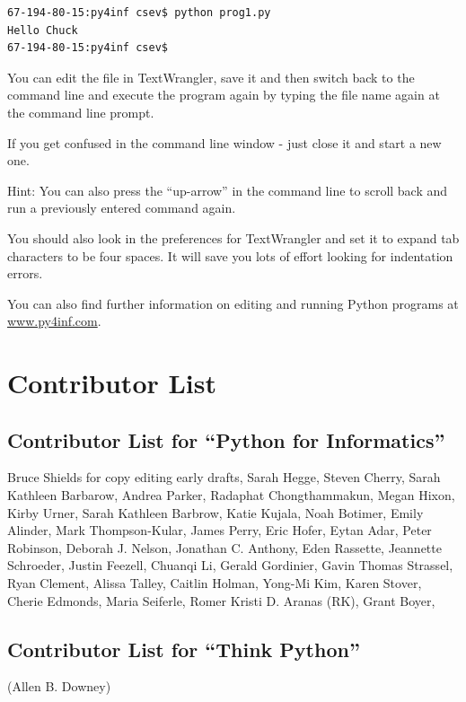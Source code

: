 \documentclass[11pt]{book}
\begin{document}
\beforeverb
\begin{verbatim}
67-194-80-15:py4inf csev$ python prog1.py
Hello Chuck
67-194-80-15:py4inf csev$ 
\end{verbatim}
\afterverb
%
You can edit the file in TextWrangler, save it and then switch back
to the command line and execute the program again by typing
the file name again at the command line prompt.

If you get confused in the command line window - just close it
and start a new one.

Hint: You can also press the ``up-arrow'' in the command line to 
scroll back and run a previously entered command again.

You should also look in the preferences for TextWrangler and set it 
to expand tab characters to be four spaces.  It will save you lots
of effort looking for indentation errors.

You can also find further information on editing and running 
Python programs at \url{www.py4inf.com}.



\chapter{Contributor List}
\section*{Contributor List for ``Python for Informatics''}

Bruce Shields for copy editing early drafts,
Sarah Hegge,
Steven Cherry,
Sarah Kathleen Barbarow,
Andrea Parker,
Radaphat Chongthammakun,
Megan Hixon,
Kirby Urner,
Sarah Kathleen Barbrow,
Katie Kujala,
Noah Botimer,
Emily Alinder,
Mark Thompson-Kular,
James Perry,
Eric Hofer,
Eytan Adar,
Peter Robinson,
Deborah J. Nelson,
Jonathan C. Anthony,
Eden Rassette,
Jeannette Schroeder,
Justin Feezell,
Chuanqi Li,
Gerald Gordinier,
Gavin Thomas Strassel,
Ryan Clement,
Alissa Talley,
Caitlin Holman,
Yong-Mi Kim,
Karen Stover,
Cherie Edmonds,
Maria Seiferle,
Romer Kristi D. Aranas (RK),
Grant Boyer,


\section*{Contributor List for ``Think Python''}


(Allen B. Downey)
\end{document}
